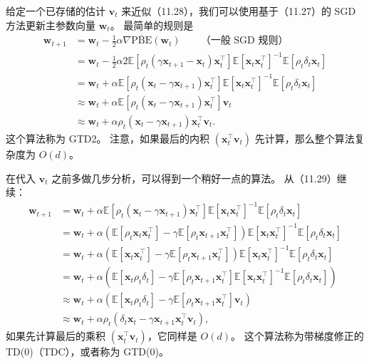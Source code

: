 \documentclass[UTF8,12pt,a4paper,fontset=fandol]{ctexart}
\begin{document}
给定一个已存储的估计 $\mathbf{v}_t$ 来近似（11.28），我们可以使用基于（11.27）的 SGD 方法更新主参数向量 $\mathbf{w}_t$。
最简单的规则是
\begin{equation}
\begin{aligned}
\mathbf{w}_{t+1}
&=\mathbf{w}_t-\frac{1}{2}\alpha\nabla\overline{\mathrm{PBE}}(\mathbf{w}_t) \qquad \text{（一般 SGD 规则）}\\
&=\mathbf{w}_t-\frac{1}{2}\alpha 2\mathbb{E}\left[\rho_t(\gamma\mathbf{x}_{t+1}-\mathbf{x}_t)\mathbf{x}_t^\top\right]\mathbb{E}\left[\mathbf{x}_t\mathbf{x}_t^\top\right]^{-1}\mathbb{E}\left[\rho_t\delta_t\mathbf{x}_t\right]\\
&=\mathbf{w}_t+\alpha\mathbb{E}\left[\rho_t(\mathbf{x}_t-\gamma\mathbf{x}_{t+1})\mathbf{x}_t^\top\right]\mathbb{E}\left[\mathbf{x}_t\mathbf{x}_t^\top\right]^{-1}\mathbb{E}\left[\rho_t\delta_t\mathbf{x}_t\right]\\
&\approx\mathbf{w}_t+\alpha\mathbb{E}\left[\rho_t(\mathbf{x}_t-\gamma\mathbf{x}_{t+1})\mathbf{x}_t^\top\right]\mathbf{v}_t\\
&\approx\mathbf{w}_t+\alpha\rho_t(\mathbf{x}_t-\gamma\mathbf{x}_{t+1})\mathbf{x}_t^\top\mathbf{v}_t .
\end{aligned}
\tag{11.29}
\end{equation}
这个算法称为 GTD2。
注意，如果最后的内积 $(\mathbf{x}_t^\top\mathbf{v}_t)$ 先计算，那么整个算法复杂度为 $O(d)$。

在代入 $\mathbf{v}_t$ 之前多做几步分析，可以得到一个稍好一点的算法。
从（11.29）继续：
\[
\begin{aligned}
\mathbf{w}_{t+1}
&=\mathbf{w}_t+\alpha\mathbb{E}\left[\rho_t(\mathbf{x}_t-\gamma\mathbf{x}_{t+1})\mathbf{x}_t^\top\right]\mathbb{E}\left[\mathbf{x}_t\mathbf{x}_t^\top\right]^{-1}\mathbb{E}\left[\rho_t\delta_t\mathbf{x}_t\right]\\
&=\mathbf{w}_t+\alpha\left(\mathbb{E}[\rho_t\mathbf{x}_t\mathbf{x}_t^\top]-\gamma\mathbb{E}[\rho_t\mathbf{x}_{t+1}\mathbf{x}_t^\top]\right)\mathbb{E}\left[\mathbf{x}_t\mathbf{x}_t^\top\right]^{-1}\mathbb{E}\left[\rho_t\delta_t\mathbf{x}_t\right]\\
&=\mathbf{w}_t+\alpha\left(\mathbb{E}[\mathbf{x}_t\mathbf{x}_t^\top]-\gamma\mathbb{E}[\rho_t\mathbf{x}_{t+1}\mathbf{x}_t^\top]\right)\mathbb{E}\left[\mathbf{x}_t\mathbf{x}_t^\top\right]^{-1}\mathbb{E}\left[\rho_t\delta_t\mathbf{x}_t\right]\\
&=\mathbf{w}_t+\alpha\left(\mathbb{E}[\mathbf{x}_t\rho_t\delta_t]-\gamma\mathbb{E}[\rho_t\mathbf{x}_{t+1}\mathbf{x}_t^\top]\mathbb{E}\left[\mathbf{x}_t\mathbf{x}_t^\top\right]^{-1}\mathbb{E}\left[\rho_t\delta_t\mathbf{x}_t\right]\right)\\
&\approx \mathbf{w}_t+\alpha\left(\mathbb{E}[\mathbf{x}_t\rho_t\delta_t]-\gamma\mathbb{E}[\rho_t\mathbf{x}_{t+1}\mathbf{x}_t^\top]\mathbf{v}_t\right)\\
&\approx \mathbf{w}_t+\alpha\rho_t\left(\delta_t\mathbf{x}_t-\gamma\mathbf{x}_{t+1}\mathbf{x}_t^\top\mathbf{v}_t\right),
\end{aligned}
\]
如果先计算最后的乘积 $(\mathbf{x}_t^\top\mathbf{v}_t)$，它同样是 $O(d)$。
这个算法称为带梯度修正的 TD(0)（TDC），或者称为 GTD(0)。
\end{document}
